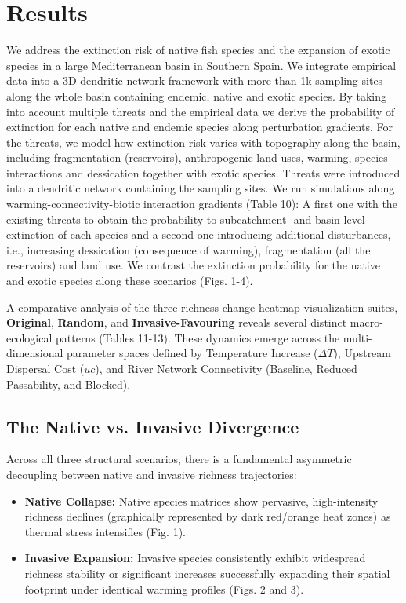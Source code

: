 \documentclass[11pt,a4paper]{article}
\begin{document}
{\section{Results}
We address the extinction risk of native fish species and the expansion of exotic species in a large Mediterranean basin in Southern Spain. We integrate empirical data into a 3D dendritic network framework with more than 1k sampling sites along the whole basin containing endemic, native and exotic species. By taking into account multiple threats and the empirical data we derive the probability of extinction for each native and endemic species along perturbation gradients. For the threats, we model how extinction risk varies with topography along the basin, including fragmentation (reservoirs), anthropogenic land uses, warming, species interactions and dessication together with exotic species. Threats were introduced into a dendritic network containing the sampling sites. We run simulations along warming-connectivity-biotic interaction gradients (Table 10): A first one with the existing threats to obtain the probability to subcatchment- and basin-level extinction of each species and a second one introducing additional disturbances, i.e., increasing dessication (consequence of warming), fragmentation (all the reservoirs) and land use. We contrast the extinction probability for the native and exotic species along these scenarios (Figs. 1-4).

A comparative analysis of the three richness change heatmap visualization suites, \textbf{Original}, \textbf{Random}, and \textbf{Invasive-Favouring} reveals several distinct macro-ecological patterns (Tables 11-13). These dynamics emerge across the multi-dimensional parameter spaces defined by Temperature Increase ($\Delta T$), Upstream Dispersal Cost ($uc$), and River Network Connectivity (Baseline, Reduced Passability, and Blocked).

\subsection{The Native vs. Invasive Divergence}
Across all three structural scenarios, there is a fundamental asymmetric decoupling between native and invasive richness trajectories:
\begin{itemize}
    \item \textbf{Native Collapse:} Native species matrices show pervasive, high-intensity richness declines (graphically represented by dark red/orange heat zones) as thermal stress intensifies (Fig. 1).
    \item \textbf{Invasive Expansion:} Invasive species consistently exhibit widespread richness stability or significant increases successfully expanding their spatial footprint under identical warming profiles (Figs. 2 and 3).
\end{itemize}

}
\end{document}
